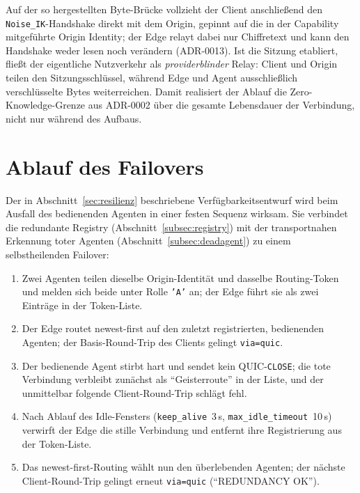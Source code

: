 Auf der so hergestellten Byte-Brücke vollzieht der Client anschließend den
\texttt{Noise\_IK}-Handshake direkt mit dem Origin, gepinnt auf die in der
Capability mitgeführte Origin Identity; der Edge relayt dabei nur Chiffretext und
kann den Handshake weder lesen noch verändern (ADR-0013). Ist die Sitzung
etabliert, fließt der eigentliche Nutzverkehr als \emph{providerblinder} Relay:
Client und Origin teilen den Sitzungsschlüssel, während Edge und Agent
ausschließlich verschlüsselte Bytes weiterreichen. Damit realisiert der Ablauf
die Zero-Knowledge-Grenze aus ADR-0002 über die gesamte Lebensdauer der
Verbindung, nicht nur während des Aufbaus.

\section{Ablauf des Failovers}
\label{sec:ablauf-failover}

Der in Abschnitt~\ref{sec:resilienz} beschriebene Verfügbarkeitsentwurf wird beim
Ausfall des bedienenden Agenten in einer festen Sequenz wirksam. Sie verbindet
die redundante Registry (Abschnitt~\ref{subsec:registry}) mit der transportnahen
Erkennung toter Agenten (Abschnitt~\ref{subsec:deadagent}) zu einem
selbstheilenden Failover:

\begin{enumerate}
  \item Zwei Agenten teilen dieselbe Origin-Identität und dasselbe Routing-Token
    und melden sich beide unter Rolle \texttt{'A'} an; der Edge führt sie als
    zwei Einträge in der Token-Liste.
  \item Der Edge routet newest-first auf den zuletzt registrierten, bedienenden
    Agenten; der Basis-Round-Trip des Clients gelingt \texttt{via=quic}.
  \item Der bedienende Agent stirbt hart und sendet kein QUIC-\texttt{CLOSE}; die
    tote Verbindung verbleibt zunächst als \enquote{Geisterroute} in der Liste,
    und der unmittelbar folgende Client-Round-Trip schlägt fehl.
  \item Nach Ablauf des Idle-Fensters (\texttt{keep\_alive}~3\,s,
    \texttt{max\_idle\_timeout}~10\,s) verwirft der Edge die stille Verbindung
    und entfernt ihre Registrierung aus der Token-Liste.
  \item Das newest-first-Routing wählt nun den überlebenden Agenten; der nächste
    Client-Round-Trip gelingt erneut \texttt{via=quic}
    (\enquote{REDUNDANCY OK}).
\end{enumerate}

